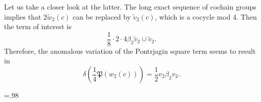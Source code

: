 \documentclass[12pt]{article}
\numberwithin{equation}{section}
\def\fP{\mathfrak{P}}
\begin{document}
Let us take a closer look at the latter.
The long exact sequence of cochain groups implies that $2\widetilde w_2(c)$ can be replaced by
$\widetilde v_2(c)$, which is a cocycle mod 4.
Then the term of interest is
\begin{equation*}
	\dfrac{1}{8}\cdot 2\cdot 4\beta_2\widetilde v_2 \cup \widetilde v_2.
\end{equation*}
Therefore, the anomalous variation of the Pontrjagin square term seems to result in
\begin{equation*}
	\delta\left(
		\dfrac{1}{4}\fP(w_2(c))
	\right)
	=
	\dfrac{1}{2}v_2 \beta_2 v_2.
\end{equation*}


\def\arxivfont{\rm}


\baselineskip=.98\baselineskip
\let\originalthebibliography\thebibliography
\renewcommand\thebibliography[1]{
  \originalthebibliography{#1}
  \setlength{\itemsep}{0pt plus 0.3ex}
}


\end{document}
